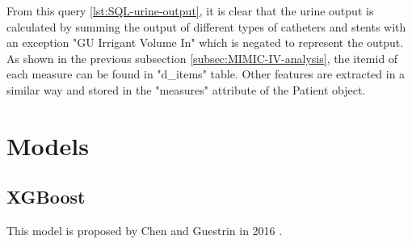 \documentclass[../main.tex]{subfiles}
\begin{document}
From this query \ref{lst:SQL-urine-output}, it is clear that the urine output is calculated by summing the output of different types of catheters and stents with an exception "GU Irrigant Volume In" which is negated to represent the output.
As shown in the previous subsection \ref{subsec:MIMIC-IV-analysis}, the itemid of each measure can be found in "d\_items" table.
Other features are extracted in a similar way and stored in the "measures" attribute of the Patient object.


\section{Models}


\subsection{XGBoost}
This model is proposed by Chen and Guestrin in 2016 \cite{chen2016xgboost}.
\end{document}
